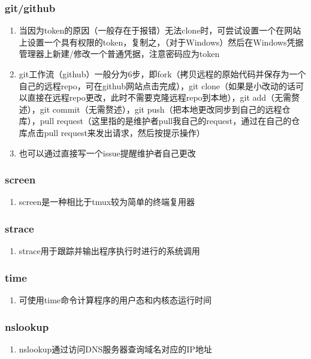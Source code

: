 \documentclass[onecolumn]{article}
\begin{document}
        \subsubsection{git/github}
            \noindent
            \begin{enumerate}
                \item 当因为token的原因（一般存在于报错）无法clone时，可尝试设置一个在网站上设置一个具有权限的token，复制之，（对于Windows）然后在Windows凭据管理器上新建/修改一个普通凭据，注意密码应为token
                \item git工作流（github）一般分为6步，即fork（拷贝远程的原始代码并保存为一个自己的远程repo，可在github网站点击完成），git clone（如果是小改动的话可以直接在远程repo更改，此时不需要克隆远程repo到本地），git add（无需赘述），git commit（无需赘述），git push（把本地更改同步到自己的远程仓库），pull request（这里指的是维护者pull我自己的request，通过在自己的仓库点击pull request来发出请求，然后按提示操作）
                \item 也可以通过直接写一个issue提醒维护者自己更改
            \end{enumerate}
        \subsubsection{screen}
            \noindent
            \begin{enumerate}
                \item screen是一种相比于tmux较为简单的终端复用器
            \end{enumerate}
        \subsubsection{strace}
            \noindent
            \begin{enumerate}
                \item strace用于跟踪并输出程序执行时进行的系统调用
            \end{enumerate}
        \subsubsection{time}
            \noindent
            \begin{enumerate}
                \item 可使用time命令计算程序的用户态和内核态运行时间
            \end{enumerate}
        \subsubsection{nslookup}
            \noindent
            \begin{enumerate}
                \item nslookup通过访问DNS服务器查询域名对应的IP地址
            \end{enumerate}
\end{document}
